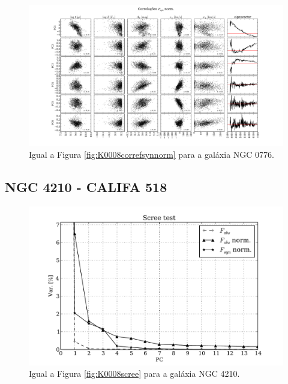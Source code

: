 \begin{figure}
    \includegraphics[width=1.3\textwidth, angle=-90]{figuras/K0073-correl-f_syn_norm-PCvsPhys.pdf}
	\caption[Correlações PCs vs. par\^ametros f\'isicos - $F_{syn}$ norm. - NGC 0001]
	{Igual a Figura \ref{fig:K0008correfsynnorm} para a galáxia NGC 0776.}
    \label{fig:K0073correfsynnorm}
\end{figure}


\subsection{NGC 4210 - CALIFA 518}

\begin{figure}
    \includegraphics[height=0.33\textheight]{figuras/K0518-screetest.pdf}
    \caption[Scree test comparativo entre 3 PCAs - NGC 4210.]
	{Igual a Figura \ref{fig:K0008scree} para a galáxia NGC 4210.}
    \label{fig:K00518scree}
\end{figure}

